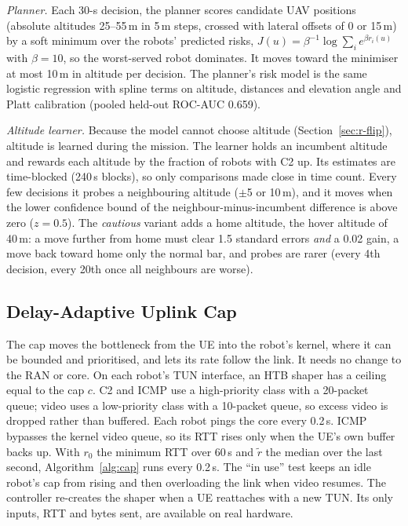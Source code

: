 \textit{Planner.} Each 30-s decision, the planner scores candidate UAV
positions (absolute altitudes 25--55\,m in 5\,m steps, crossed with lateral
offsets of 0 or 15\,m) by a soft minimum over the robots' predicted risks,
$J(u) = \beta^{-1}\log\sum_i e^{\beta r_i(u)}$ with $\beta = 10$, so the
worst-served robot dominates. It moves toward the minimiser at most 10\,m in
altitude per decision. The planner's risk model is the same logistic
regression with spline terms on altitude, distances and elevation angle and
Platt calibration (pooled held-out ROC-AUC 0.659).

\textit{Altitude learner.} Because the model cannot choose altitude
(Section~\ref{sec:r-flip}), altitude is learned during the mission. The learner
holds an incumbent altitude and rewards each altitude by the fraction of robots
with C2 up. Its estimates are time-blocked (240\,s blocks), so only comparisons
made close in time count. Every few decisions it probes a neighbouring altitude
($\pm$5 or 10\,m), and it moves when the lower confidence bound of the
neighbour-minus-incumbent difference is above zero ($z = 0.5$). The
\emph{cautious} variant adds a home altitude, the hover altitude of 40\,m: a
move further from home must clear 1.5 standard errors \emph{and} a 0.02 gain,
a move back toward home only the normal bar, and probes are rarer (every 4th
decision, every 20th once all neighbours are worse).

\subsection{Delay-Adaptive Uplink Cap}
\label{sec:cap}
The cap moves the bottleneck from the UE into the robot's kernel, where it can
be bounded and prioritised, and lets its rate follow the link. It needs no
change to the RAN or core. On each robot's TUN interface, an HTB shaper has a
ceiling equal to the cap $c$. C2 and ICMP use a high-priority class with a
20-packet queue; video uses a low-priority class with a 10-packet queue, so
excess video is dropped rather than buffered. Each robot pings the core every
0.2\,s. ICMP bypasses the kernel video queue, so its RTT rises only when the
UE's own buffer backs up. With $r_0$ the minimum RTT over 60\,s and $\tilde r$
the median over the last second, Algorithm~\ref{alg:cap} runs every 0.2\,s.
The ``in use'' test keeps an idle robot's cap from rising and then overloading
the link when video resumes. The controller re-creates the shaper when a UE
reattaches with a new TUN. Its only inputs, RTT and bytes sent, are available
on real hardware.

